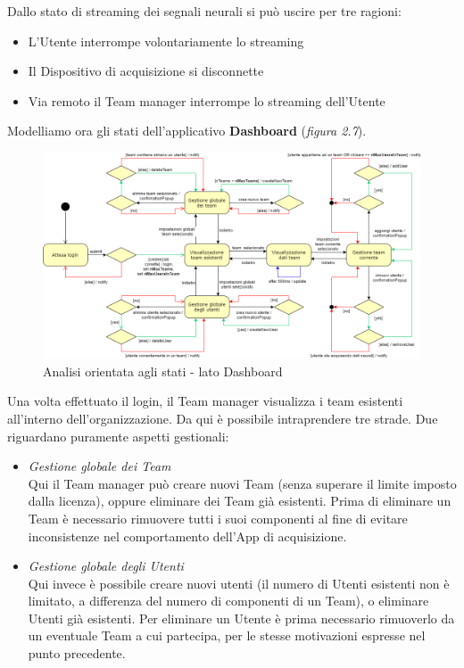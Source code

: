 \noindent Dallo stato di streaming dei segnali neurali si può uscire per tre ragioni: 
\begin{itemize}
  \item L'Utente interrompe volontariamente lo streaming
  \item Il Dispositivo di acquisizione si disconnette
  \item Via remoto il Team manager interrompe lo streaming dell'Utente
\end{itemize}

\vspace{5mm}
\noindent Modelliamo ora gli stati dell'applicativo {\bf Dashboard} (\emph{figura 2.7}).
\vspace{5mm}
\begin{figure}[H]
  \centering
  \includegraphics[width=1.0\textwidth]{img/Dashboard - fsm.png}
  \caption{Analisi orientata agli stati - lato Dashboard}
\end{figure}
\noindent Una volta effettuato il login, il Team manager visualizza i team esistenti all'interno dell'organizzazione.\newline
Da qui è possibile intraprendere tre strade. Due riguardano puramente aspetti gestionali:\newline
\begin{itemize}
  \item \emph{Gestione globale dei Team}\\
  {Qui il Team manager può creare nuovi Team (senza superare il limite imposto dalla licenza), oppure eliminare dei Team già esistenti.\newline
  Prima di eliminare un Team è necessario rimuovere tutti i suoi componenti al fine di evitare inconsistenze nel comportamento dell'App di acquisizione.}
  \item \emph{Gestione globale degli Utenti}\\
  {Qui invece è possibile creare nuovi utenti (il numero di Utenti esistenti non è limitato, a differenza del numero di componenti di un Team), o eliminare Utenti già esistenti.\newline
  Per eliminare un Utente è prima necessario rimuoverlo da un eventuale Team a cui partecipa, per le stesse motivazioni espresse nel punto precedente.}
\end{itemize}

